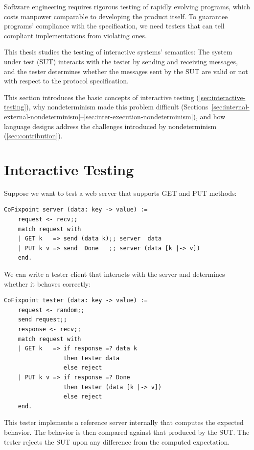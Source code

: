 Software engineering requires rigorous testing of rapidly evolving programs,
which costs manpower comparable to developing the product itself.  To guarantee
programs' compliance with the specification, we need testers that can tell
compliant implementations from violating ones.

This thesis studies the testing of interactive systems' semantics: The system
under test (SUT) interacts with the tester by sending and receiving messages,
and the tester determines whether the messages sent by the SUT are valid or not
with respect to the protocol specification.

This section introduces the basic concepts of interactive testing
(\autoref{sec:interactive-testing}), why nondeterminism made this problem
difficult
(Sections~\ref{sec:internal-external-nondeterminism}--\ref{sec:inter-execution-nondeterminism}),
and how language designs address the challenges introduced by nondeterminism
(\autoref{sec:contribution}).

\section{Interactive Testing}
\label{sec:interactive-testing}
Suppose we want to test a web server that supports GET and PUT methods:
\begin{lstlisting}[style=customcoq]
  CoFixpoint server (data: key -> value) :=
    request <- recv;;
    match request with
    | GET k   => send (data k);; server  data
    | PUT k v => send  Done   ;; server (data [k |-> v])
    end.
\end{lstlisting}
We can write a tester client that interacts with the server and determines
whether it behaves correctly:
\begin{lstlisting}[style=customcoq]
  CoFixpoint tester (data: key -> value) :=
    request <- random;;
    send request;;
    response <- recv;;
    match request with
    | GET k   => if response =? data k
                 then tester data
                 else reject
    | PUT k v => if response =? Done
                 then tester (data [k |-> v])
                 else reject
    end.
\end{lstlisting}
This tester implements a reference server internally that computes the expected
behavior.  The behavior is then compared against that produced by the SUT.  The
tester rejects the SUT upon any difference from the computed expectation.

